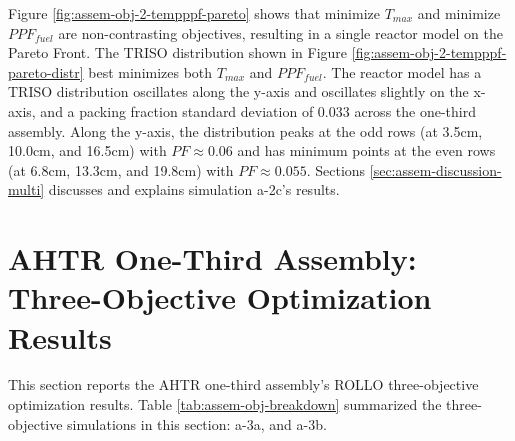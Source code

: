 Figure \ref{fig:assem-obj-2-tempppf-pareto} shows that minimize $T_{max}$ and minimize 
$PPF_{fuel}$ are non-contrasting objectives, resulting in a single reactor model on the 
Pareto Front. 
The TRISO distribution shown in Figure \ref{fig:assem-obj-2-tempppf-pareto-distr} best 
minimizes both $T_{max}$ and $PPF_{fuel}$. 
The reactor model has a TRISO distribution oscillates along the y-axis and oscillates 
slightly on the x-axis, and a packing fraction standard deviation of $0.033$ across 
the one-third assembly. 
Along the y-axis, the distribution peaks at the odd rows (at 3.5cm, 10.0cm, and 16.5cm) 
with $PF\approx0.06$ and has minimum points at the even rows (at 6.8cm, 13.3cm, and 
19.8cm) with $PF\approx0.055$.
Sections \ref{sec:assem-discussion-multi} discusses and explains simulation a-2c's 
results.

\pagebreak
\section{AHTR One-Third Assembly: Three-Objective Optimization Results}
\label{assem-three-obj}
This section reports the \gls{AHTR} one-third assembly's \gls{ROLLO} three-objective 
optimization results. 
Table \ref{tab:assem-obj-breakdown} summarized the three-objective simulations in this 
section: a-3a, and a-3b. 

